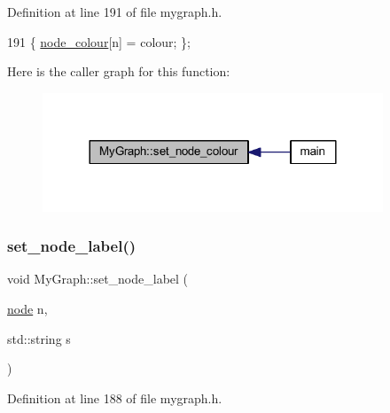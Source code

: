 Definition at line 191 of file mygraph.\+h.


\begin{DoxyCode}
191 \{ \mbox{\hyperlink{class_my_graph_aa42370fd94b5789077f0ad70b76e4285}{node\_colour}}[n] = colour; \};
\end{DoxyCode}
Here is the caller graph for this function\+:
\nopagebreak
\begin{figure}[H]
\begin{center}
\leavevmode
\includegraphics[width=288pt]{class_my_graph_a4cada42859b2a657637e81eef7c6e4ab_icgraph}
\end{center}
\end{figure}
\mbox{\label{class_my_graph_ac70ce0dc28c8589443e45ef89acd00ca}} 
\subsubsection{\texorpdfstring{set\+\_\+node\+\_\+label()}{set\_node\_label()}}
{\footnotesize\ttfamily void My\+Graph\+::set\+\_\+node\+\_\+label (\begin{DoxyParamCaption}\item[{\mbox{\hyperlink{classnode}{node}}}]{n,  }\item[{std\+::string}]{s }\end{DoxyParamCaption})\hspace{0.3cm}{\ttfamily [inline]}}



Definition at line 188 of file mygraph.\+h.


